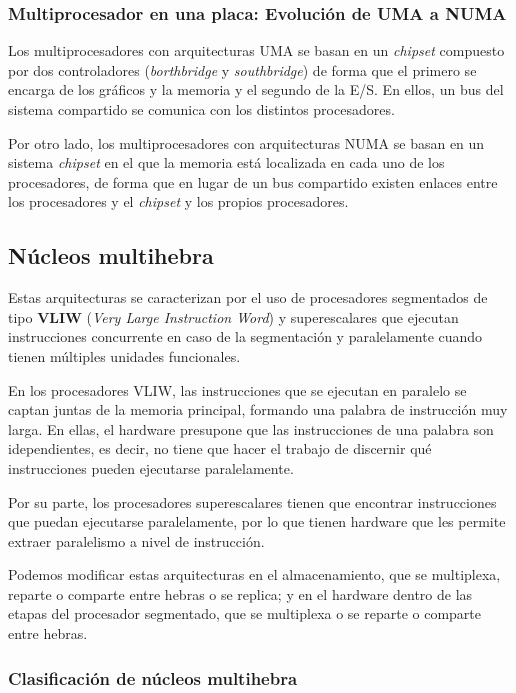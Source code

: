 \subsubsection{Multiprocesador en una placa: Evolución de UMA a NUMA}

Los multiprocesadores con arquitecturas UMA se basan en un \textit{chipset} compuesto por dos controladores (\textit{borthbridge} y \textit{southbridge}) de forma que el primero se encarga de los gráficos y la memoria y el segundo de la E/S.
En ellos, un bus del sistema compartido se comunica con los distintos procesadores.

Por otro lado, los multiprocesadores con arquitecturas NUMA se basan en un sistema \textit{chipset} en el que la memoria está localizada en cada uno de los procesadores, de forma que en lugar de un bus compartido existen enlaces entre los procesadores y el \textit{chipset} y los propios procesadores.

\subsection{Núcleos multihebra}

Estas arquitecturas se caracterizan por el uso de procesadores segmentados de tipo \textbf{VLIW} (\textit{Very Large Instruction Word}) y superescalares que ejecutan instrucciones concurrente en caso de la segmentación y paralelamente cuando tienen múltiples unidades funcionales.

En los procesadores VLIW, las instrucciones que se ejecutan en paralelo se captan juntas de la memoria principal, formando una palabra de instrucción muy larga.
En ellas, el hardware presupone que las instrucciones de una palabra son idependientes, es decir, no tiene que hacer el trabajo de discernir qué instrucciones pueden ejecutarse paralelamente.

Por su parte, los procesadores superescalares tienen que encontrar instrucciones que puedan ejecutarse paralelamente, por lo que tienen hardware que les permite extraer paralelismo a nivel de instrucción.

Podemos modificar estas arquitecturas en el almacenamiento, que se multiplexa, reparte o comparte entre hebras o se replica; y en el hardware dentro de las etapas del procesador segmentado, que se multiplexa o se reparte o comparte entre hebras.

\subsubsection{Clasificación de núcleos multihebra}

